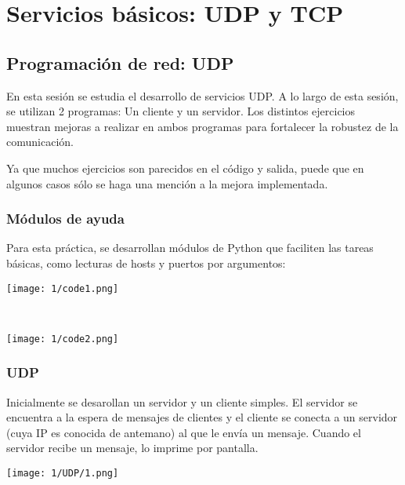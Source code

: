 \chapter{Servicios básicos: UDP y TCP}\label{chap:1}
\section{Programación de red: UDP}

En esta sesión se estudia el desarrollo de servicios UDP.
A lo largo de esta sesión, se utilizan 2 programas: Un cliente y un servidor.
Los distintos ejercicios muestran mejoras a realizar en ambos programas
para fortalecer la robustez de la comunicación.

Ya que muchos ejercicios son parecidos en el código y salida,
puede que en algunos casos sólo se haga una mención a la mejora implementada.

\subsection{Módulos de ayuda}
Para esta práctica, se desarrollan módulos de Python que faciliten las tareas básicas,
como lecturas de hosts y puertos por argumentos: \\
\begin{minipage}{\linewidth}
	\centering
	\texttt{[image: 1/code1.png]}
	\label{fig:1/code1}
\end{minipage}
\\
\begin{minipage}{\linewidth}
	\centering
	\texttt{[image: 1/code2.png]}
	\label{fig:1/code2}
\end{minipage}

\subsection{UDP}

Inicialmente se desarollan un servidor y un cliente simples.
El servidor se encuentra a la espera de mensajes de clientes
y el cliente se conecta a un servidor (cuya IP es conocida de antemano)
al que le envía un mensaje.
Cuando el servidor recibe un mensaje, lo imprime por pantalla.

\begin{minipage}{\linewidth}
	\centering
	\texttt{[image: 1/UDP/1.png]}
	\label{fig:1/1}
\end{minipage}

